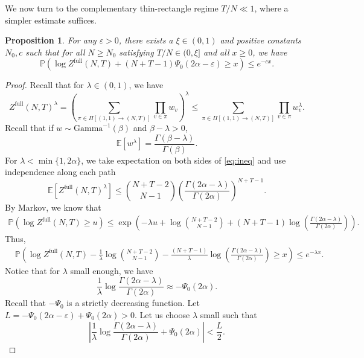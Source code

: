 \documentclass[11pt]{article}
\newtheorem{proposition}[theorem]{Proposition}
\theoremstyle{definition}
\newcommand{\E}{\mathbb{E}}
\newcommand{\Prob}{\mathbb{P}}
\newcommand{\Zfull}{Z^{\mathrm{full}}}
\begin{document}
We now turn to the complementary {thin-rectangle} regime $T/N\ll 1$, where a simpler estimate suffices.
\begin{proposition}\label{prop:thin-rect}
    For any $\varepsilon > 0$, there exists a $\xi \in (0,1)$ and positive constants $N_0, c$ such that for all $N \geq N_0$ satisfying $T/N \in (0, \xi]$ and all $x \geq 0$, we have
    \begin{equation}\label{eq:thin_rect}
        \Prob\left(\log \Zfull(N,T) + (N+T-1)\Psi_0(2\alpha-\varepsilon)\geq x \right) \leq e^{-cx}.
    \end{equation}  
\end{proposition}

\begin{proof}
Recall that for $\lambda \in (0,1)$, we have
\begin{equation}\label{eq:ineq}
\Zfull(N,T)^\lambda =\left( \sum_{\pi \in \Pi[(1,1) \rightarrow (N,T)]} \prod_{v \in \pi} w_v\right)^\lambda \leq \sum_{\pi \in \Pi[(1,1) \rightarrow (N,T)]} \prod_{v \in \pi} w_v^\lambda.
\end{equation}
Recall that if $w \sim \mathrm{Gamma}^{-1}(\beta)$ and $\beta-\lambda > 0$,
\[
\E[w^\lambda] = \frac{\Gamma(\beta - \lambda)}{\Gamma(\beta)}.
\] 
For $\lambda < \min\{1, 2\alpha\}$, we take expectation on both sides of \eqref{eq:ineq} and use independence along each path
\[
\E[\Zfull(N,T)^\lambda] \leq \binom{N+T-2}{N-1}\left( \frac{\Gamma(2\alpha -\lambda)}{\Gamma(2\alpha)}\right)^{N+T-1}.
\]
By Markov, we know that
\[
\begin{split}
    \Prob\left( \log \Zfull(N,T) \geq u \right)\leq \exp\left(-\lambda u + \log \binom{N+T-2}{N-1}+ (N+T-1)\log \left(\frac{\Gamma(2\alpha - \lambda)}{\Gamma(2\alpha)} \right) \right).
\end{split}
\]
Thus,
\[
\begin{split}
    &\Prob\left( \log \Zfull(N,T) - \frac{1}{\lambda} \log \binom{N+T-2}{N-1}-\frac{(N+T-1)}{\lambda} \log \left(\frac{\Gamma(2\alpha - \lambda)}{\Gamma(2\alpha)} \right) \geq x \right) \leq e^{-\lambda x}.
\end{split}
\]
Notice that for $\lambda$ small enough, we have
\[
\frac{1}{\lambda}\log\frac{\Gamma(2\alpha - \lambda)}{\Gamma(2\alpha)} \approx -\Psi_0(2\alpha).
\]
Recall that $-\Psi_0$ is a strictly decreasing function. Let $L = -\Psi_0(2\alpha-\varepsilon) + \Psi_0(2\alpha) > 0$. Let us choose $\lambda$ small such that 
\[
\left|\frac{1}{\lambda}\log\frac{\Gamma(2\alpha - \lambda)}{\Gamma(2\alpha)} + \Psi_0(2\alpha)\right| < \frac{L}{2}.
\]
\end{proof}
\end{document}
